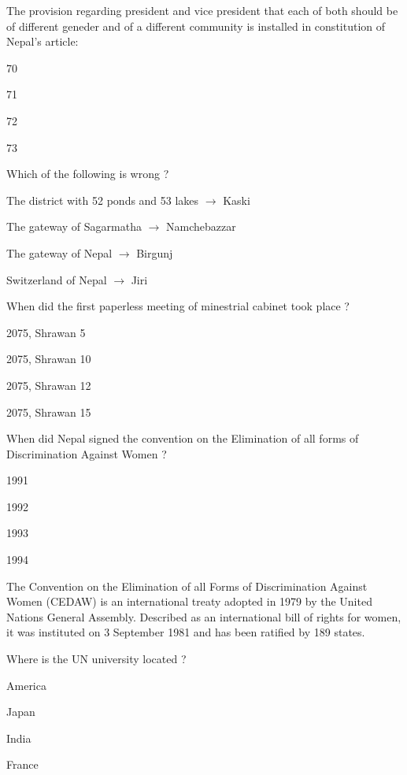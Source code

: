 \begin{questions}
\question The provision regarding president and vice president that each of both should be of different geneder and of a different community is installed in constitution of Nepal's article:
  \begin{items}
  \item 70
  \item 71
  \item 72
  \item* 73
  \end{items}

\question Which of the following is wrong ?
  \begin{items}
  \item The district with 52 ponds and 53 lakes $\longrightarrow$ Kaski
  \item The gateway of Sagarmatha $\longrightarrow$ Namchebazzar
  \item The gateway of Nepal $\longrightarrow$ Birgunj
  \item Switzerland of Nepal $\longrightarrow$ Jiri
  \end{items}

\question When did the first paperless meeting of minestrial cabinet took place ?
  \begin{items}
  \item 2075, Shrawan 5
  \item* 2075, Shrawan 10
  \item 2075, Shrawan 12
  \item 2075, Shrawan 15
  \end{items}

\question When did Nepal signed the convention on the Elimination of all forms of Discrimination Against Women ?
  \begin{items}
  \item* 1991
  \item 1992
  \item 1993
  \item 1994
  \end{items}

  \begin{solution}
  The Convention on the Elimination of all Forms of Discrimination Against Women (CEDAW) is an international treaty adopted in 1979 by the United Nations General Assembly. Described as an international bill of rights for women, it was instituted on 3 September 1981 and has been ratified by 189 states.
  \end{solution}

\question Where is the UN university located ?
  \begin{items}
  \item America
  \item Japan
  \item* India
  \item France
  \end{items}


\end{questions}
